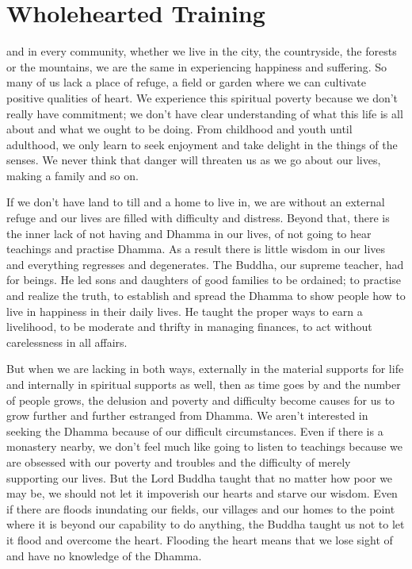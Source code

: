 
\chapter{Wholehearted Training}

 and in every community, whether we live in the city, the countryside, the forests or the mountains, we are the same in experiencing happiness and suffering. So many of us lack a place of refuge, a field or garden where we can cultivate positive qualities of heart. We experience this spiritual poverty because we don't really have commitment; we don't have clear understanding of what this life is all about and what we ought to be doing. From childhood and youth until adulthood, we only learn to seek enjoyment and take delight in the things of the senses. We never think that danger will threaten us as we go about our lives, making a family and so on. 

If we don't have land to till and a home to live in, we are without an external refuge and our lives are filled with difficulty and distress. Beyond that, there is the inner lack of not having  and Dhamma in our lives, of not going to hear teachings and practise Dhamma. As a result there is little wisdom in our lives and everything regresses and degenerates. The Buddha, our supreme teacher, had  for beings. He led sons and daughters of good families to be ordained; to practise and realize the truth, to establish and spread the Dhamma to show people how to live in happiness in their daily lives. He taught the proper ways to earn a livelihood, to be moderate and thrifty in managing finances, to act without carelessness in all affairs. 

But when we are lacking in both ways, externally in the material supports for life and internally in spiritual supports as well, then as time goes by and the number of people grows, the delusion and poverty and difficulty become causes for us to grow further and further estranged from Dhamma. We aren't interested in seeking the Dhamma because of our difficult circumstances. Even if there is a monastery nearby, we don't feel much like going to listen to teachings because we are obsessed with our poverty and troubles and the difficulty of merely supporting our lives. But the Lord Buddha taught that no matter how poor we may be, we should not let it impoverish our hearts and starve our wisdom. Even if there are floods inundating our fields, our villages and our homes to the point where it is beyond our capability to do anything, the Buddha taught us not to let it flood and overcome the heart. Flooding the heart means that we lose sight of and have no knowledge of the Dhamma. 

